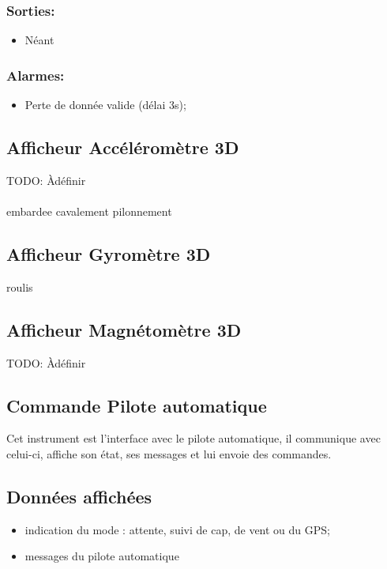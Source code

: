 \documentclass[a4paper,11pt]{report}
\begin{document}
\subsubsection{Sorties:}
\begin{itemize}
	\item Néant
\end{itemize}

\subsubsection{Alarmes:}
\begin{itemize}
	\item Perte de donnée valide (délai 3s);
\end{itemize}

\subsection{Afficheur Accéléromètre 3D}
TODO: Àdéfinir
\paragraph{}
\gls{embardee}
\gls{cavalement}
\gls{pilonnement}
\subsection{Afficheur Gyromètre 3D}
\gls{roulis}

\subsection{Afficheur Magnétomètre 3D}
TODO: Àdéfinir
\paragraph{}

\subsection{Commande Pilote automatique}
Cet instrument est l'interface avec le pilote automatique, il communique avec celui-ci,
affiche son état, ses messages et lui envoie des commandes.


\subsection{Données affichées}
\begin{itemize}
	\item indication du mode : attente, suivi de cap, de vent ou du GPS;
	\item messages du pilote automatique
\end{itemize}
\end{document}
